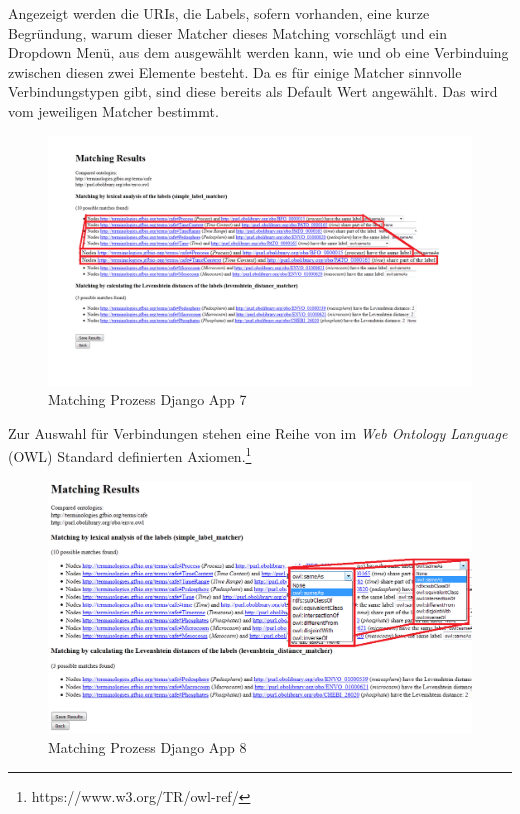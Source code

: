 		\pagebreak[4]
		Angezeigt werden die URIs, die Labels, sofern vorhanden, eine kurze
		Begründung, warum dieser Matcher dieses Matching vorschlägt und ein Dropdown
		Menü, aus dem ausgewählt werden kann, wie und ob eine Verbinduing zwischen
		diesen zwei Elemente besteht. Da es für einige Matcher sinnvolle
		Verbindungstypen gibt, sind diese bereits als Default Wert angewählt. Das
		wird vom jeweiligen Matcher bestimmt.
		\begin{figure}[h!]
		\centering
		\includegraphics[width=1.0\textwidth]{pics/SimpleOntologyMatcher-Process7.png}
		\caption{Matching Prozess Django App 7}
		\label{fig11}
		\end{figure}
		
		\pagebreak[4]
		Zur Auswahl für Verbindungen stehen eine Reihe von im \textit{Web Ontology
		Language} (OWL) Standard definierten
		Axiomen.\footnote{https://www.w3.org/TR/owl-ref/}
		\begin{figure}[h!]
		\centering
		\includegraphics[width=1.0\textwidth]{pics/SimpleOntologyMatcher-Process9.png}
		\caption{Matching Prozess Django App 8}
		\label{fig12}
		\end{figure}
		
